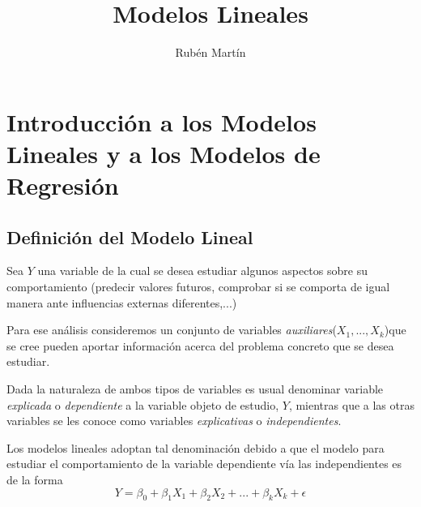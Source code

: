 \documentclass[10pt,a4paper]{book}
\author{Rubén Martín}
\title{Modelos Lineales}
\date{}
\begin{document}
\maketitle
\tableofcontents

\chapter{Introducción a los Modelos Lineales y a los Modelos de Regresión}
	\section{Definición del Modelo Lineal}
Sea $Y$ una variable de la cual se desea estudiar algunos aspectos sobre su comportamiento (predecir valores futuros, comprobar si se comporta de igual manera ante influencias externas diferentes,...)

Para ese análisis consideremos un conjunto de variables \textit{auxiliares}($X_1,...,X_k$)que se cree pueden aportar información acerca del problema concreto que se desea estudiar.

Dada la naturaleza de ambos tipos de variables es usual denominar variable \emph{explicada} o \emph{dependiente} a la variable objeto de estudio, $Y$, mientras que a las otras variables se les conoce como variables \emph{explicativas} o \emph{independientes}.

Los modelos lineales adoptan tal denominación debido a que el modelo para estudiar el comportamiento de la variable dependiente vía las independientes es de la forma $$Y = \beta_0 + \beta_1X_1 + \beta_2X_2 +...+ \beta_kX_k + \epsilon$$
\end{document}
